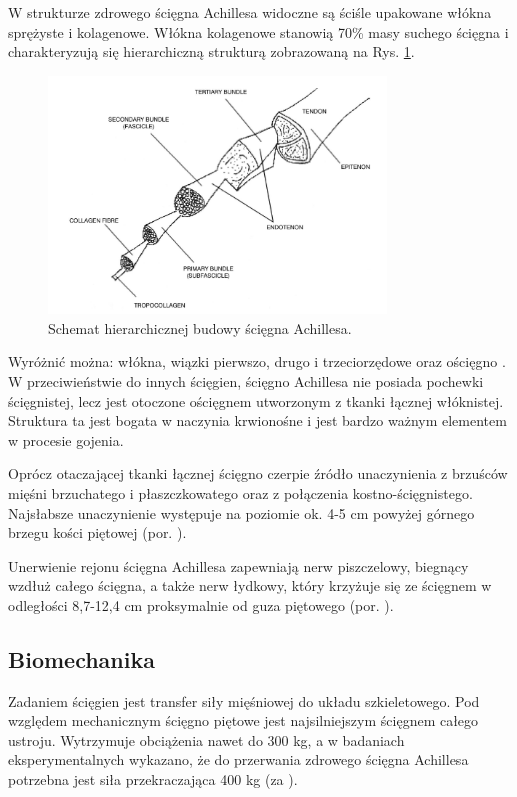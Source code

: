 W strukturze zdrowego ścięgna Achillesa widoczne są ściśle upakowane włókna sprężyste i kolagenowe. Włókna kolagenowe stanowią 70\% masy suchego ścięgna i charakteryzują się hierarchiczną strukturą zobrazowaną na Rys. \ref{Achilles-histology}.  
\begin{figure}[h!]
	\centering
	\includegraphics[width=0.8\textwidth]{figures/Achilles_hist.png}
	\caption{Schemat hierarchicznej budowy ścięgna Achillesa.}
	\label{Achilles-histology}
\end{figure}

Wyróżnić można: włókna, wiązki pierwszo, drugo i trzeciorzędowe oraz ościęgno \cite{Sharma2006}. W przeciwieństwie do innych ścięgien, ścięgno Achillesa nie posiada pochewki ścięgnistej, lecz jest otoczone ościęgnem utworzonym z tkanki łącznej włóknistej. Struktura ta jest bogata w naczynia krwionośne i jest bardzo ważnym elementem w procesie gojenia. 

Oprócz otaczającej tkanki łącznej ścięgno czerpie źródło unaczynienia z brzuśców mięśni brzuchatego i płaszczkowatego oraz z połączenia kostno-ścięgnistego. Najsłabsze unaczynienie występuje na poziomie ok. 4-5 cm powyżej górnego brzegu kości piętowej (por. \cite{bochenek2016anatomia}).

Unerwienie rejonu ścięgna Achillesa zapewniają nerw piszczelowy, biegnący wzdłuż całego ścięgna, a także nerw łydkowy, który krzyżuje się ze ścięgnem w odległości 8,7-12,4 cm proksymalnie od guza piętowego (por. \cite{bochenek2016anatomia}). 

\subsection{Biomechanika}
\label{Biomechanika}
Zadaniem ścięgien jest transfer siły mięśniowej do układu szkieletowego. Pod względem mechanicznym ścięgno piętowe jest najsilniejszym ścięgnem całego ustroju. Wytrzymuje obciążenia nawet do 300 kg, a w badaniach eksperymentalnych wykazano, że do przerwania zdrowego ścięgna Achillesa potrzebna jest siła przekraczająca 400 kg (za \cite{Etiologia}). 

